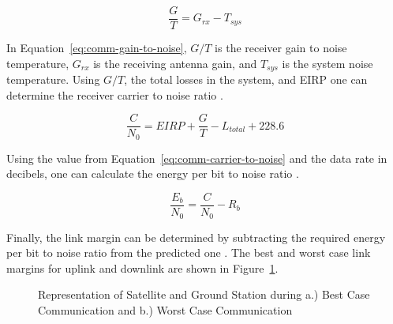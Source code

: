 \documentclass[12pt]{article}
\begin{document}
\begin{equation}\label{eq:comm-gain-to-noise}
\frac{G}{T} =  G_{rx} - T_{sys} 
\end{equation}

In Equation~\ref{eq:comm-gain-to-noise}, $G/T$ is the receiver gain to noise temperature, $G_{rx}$ is the receiving antenna gain, and $T_{sys}$ is the system noise temperature. Using $G/T$, the total losses in the system, and EIRP one can determine the receiver carrier to noise ratio \cite[p.~477]{SMAD}.

\begin{equation}\label{eq:comm-carrier-to-noise}
\frac{C}{N_0} = EIRP + \frac{G}{T} - L_{total} + 228.6 
\end{equation}

Using the value from Equation~\ref{eq:comm-carrier-to-noise} and the data rate in decibels, one can calculate the energy per bit to noise ratio \cite[p.~478]{SMAD}.

\begin{equation}\label{eq:comm-energy-to-noise}
\frac{E_b}{N_0} = \frac{C}{N_0} - R_b 
\end{equation}

Finally, the link margin can be determined by subtracting the required energy per bit to noise ratio from the predicted one \cite[p.~478]{SMAD}. The best and worst case link margins for uplink and downlink are shown in Figure~\ref{fig:comm_cases}.


\begin{figure}
\hfill
{}
\hfill
{}
\hfill
\caption{Representation of Satellite and Ground Station during a.) Best Case Communication and b.) Worst Case Communication}
\label{fig:comm_cases}
\end{figure}
		
\end{document}
